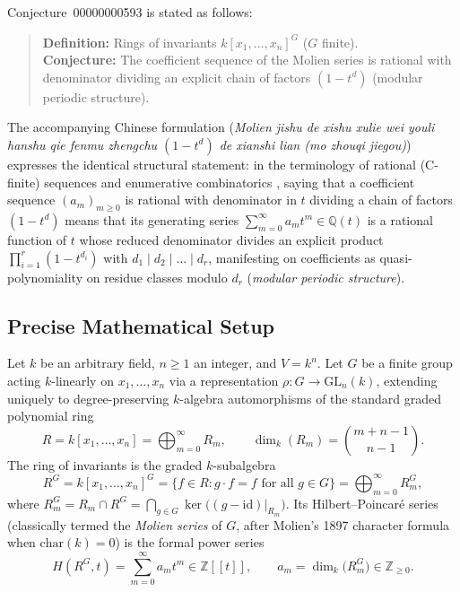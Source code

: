 \documentclass[11pt]{article}
\theoremstyle{definition}
\theoremstyle{remark}
\begin{document}
Conjecture~00000000593 is stated as follows:
\begin{quote}
\textbf{Definition:} Rings of invariants $k[x_1,\dots,x_n]^G$ ($G$ finite).\\
\textbf{Conjecture:} The coefficient sequence of the Molien series is rational with denominator dividing an explicit chain of factors $(1 - t^d)$ (modular periodic structure).
\end{quote}
The accompanying Chinese formulation (\emph{Molien jishu de xishu xulie wei youli hanshu qie fenmu zhengchu $(1 - t^d)$ de xianshi lian (mo zhouqi jiegou)}) expresses the identical structural statement: in the terminology of rational (C-finite) sequences and enumerative combinatorics \cite{StanleyEC1}, saying that a coefficient sequence $(a_m)_{m \ge 0}$ is rational with denominator in $t$ dividing a chain of factors $(1 - t^d)$ means that its generating series $\sum_{m=0}^{\infty} a_m t^m \in \mathbb{Q}(t)$ is a rational function of $t$ whose reduced denominator divides an explicit product $\prod_{i=1}^r (1 - t^{d_i})$ with $d_1 \mid d_2 \mid \dots \mid d_r$, manifesting on coefficients as quasi-polynomiality on residue classes modulo $d_r$ (\emph{modular periodic structure}).

\subsection{Precise Mathematical Setup}

Let $k$ be an arbitrary field, $n \ge 1$ an integer, and $V = k^n$. Let $G$ be a finite group acting $k$-linearly on $x_1,\dots,x_n$ via a representation $\rho : G \to \mathrm{GL}_n(k)$, extending uniquely to degree-preserving $k$-algebra automorphisms of the standard graded polynomial ring
\[
R = k[x_1,\dots,x_n] = \bigoplus_{m=0}^{\infty} R_m, \qquad \dim_k(R_m) = \binom{m+n-1}{n-1}.
\]
The ring of invariants is the graded $k$-subalgebra
\[
R^G = k[x_1,\dots,x_n]^G = \{ f \in R : g \cdot f = f \text{ for all } g \in G \} = \bigoplus_{m=0}^{\infty} R_m^G,
\]
where $R_m^G = R_m \cap R^G = \bigcap_{g \in G} \ker\bigl((g - \mathrm{id})|_{R_m}\bigr)$. Its Hilbert--Poincar\'e series (classically termed the \emph{Molien series} of $G$, after Molien's 1897 character formula when $\mathrm{char}(k) = 0$) is the formal power series
\[
H(R^G, t) = \sum_{m=0}^{\infty} a_m t^m \in \mathbb{Z}[[t]], \qquad a_m = \dim_k\bigl(R_m^G\bigr) \in \mathbb{Z}_{\ge 0}.
\]
\end{document}
